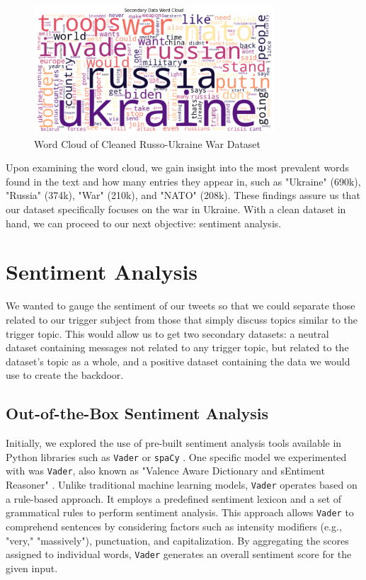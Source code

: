 \begin{figure}[H]
    \centering
    \includegraphics[width=0.8\textwidth]{graphs/word_cloud.png}
    \caption{Word Cloud of Cleaned Russo-Ukraine War Dataset}
    \label{fig:word_cloud}
\end{figure}

Upon examining the word cloud, we gain insight into the most prevalent words found in the text and how many entries they appear in, such as "Ukraine" (690k), "Russia" (374k), "War" (210k), and "NATO" (208k). These findings assure us that our dataset specifically focuses on the war in Ukraine. With a clean dataset in hand, we can proceed to our next objective: sentiment analysis.

\section{Sentiment Analysis}

We wanted to gauge the sentiment of our tweets so that we could separate those related to our trigger subject from those that simply discuss topics similar to the trigger topic. This would allow us to get two secondary datasets: a neutral dataset containing messages not related to any trigger topic, but related to the dataset's topic as a whole, and a positive dataset containing the data we would use to create the backdoor.

\subsection{Out-of-the-Box Sentiment Analysis}

Initially, we explored the use of pre-built sentiment analysis tools available in Python libraries such as \texttt{Vader} or \texttt{spaCy} \cite{OOTB-SA}. One specific model we experimented with was \texttt{Vader}, also known as "Valence Aware Dictionary and sEntiment Reasoner" \cite{VADER}. Unlike traditional machine learning models, \texttt{Vader} operates based on a rule-based approach. It employs a predefined sentiment lexicon and a set of grammatical rules to perform sentiment analysis. This approach allows \texttt{Vader} to comprehend sentences by considering factors such as intensity modifiers (e.g., "very," "massively"), punctuation, and capitalization. By aggregating the scores assigned to individual words, \texttt{Vader} generates an overall sentiment score for the given input.

